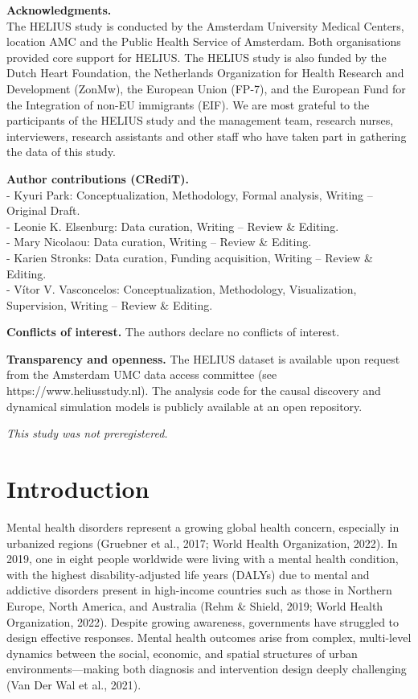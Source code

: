\documentclass[
]{article}
\begin{document}
\textbf{Acknowledgments.}\\
The HELIUS study is conducted by the Amsterdam University Medical
Centers, location AMC and the Public Health Service of Amsterdam. Both
organisations provided core support for HELIUS. The HELIUS study is also
funded by the Dutch Heart Foundation, the Netherlands Organization for
Health Research and Development (ZonMw), the European Union (FP-7), and
the European Fund for the Integration of non-EU immigrants (EIF). We are
most grateful to the participants of the HELIUS study and the management
team, research nurses, interviewers, research assistants and other staff
who have taken part in gathering the data of this study.

\textbf{Author contributions (CRediT).}\\
- Kyuri Park: Conceptualization, Methodology, Formal analysis, Writing
-- Original Draft.\\
- Leonie K. Elsenburg: Data curation, Writing -- Review \& Editing.\\
- Mary Nicolaou: Data curation, Writing -- Review \& Editing.\\
- Karien Stronks: Data curation, Funding acquisition, Writing -- Review
\& Editing.\\
- Vítor V. Vasconcelos: Conceptualization, Methodology, Visualization,
Supervision, Writing -- Review \& Editing.

\textbf{Conflicts of interest.} The authors declare no conflicts of
interest.

\textbf{Transparency and openness.} The HELIUS dataset is available upon
request from the Amsterdam UMC data access committee (see
https://www.heliusstudy.nl). The analysis code for the causal discovery
and dynamical simulation models is publicly available at an open
repository.

\emph{This study was not preregistered.}

\newpage

\section{Introduction}\label{introduction}

Mental health disorders represent a growing global health concern,
especially in urbanized regions (Gruebner et al., 2017; World Health
Organization, 2022). In 2019, one in eight people worldwide were living
with a mental health condition, with the highest disability-adjusted
life years (DALYs) due to mental and addictive disorders present in
high-income countries such as those in Northern Europe, North America,
and Australia (Rehm \& Shield, 2019; World Health Organization, 2022).
Despite growing awareness, governments have struggled to design
effective responses. Mental health outcomes arise from complex,
multi-level dynamics between the social, economic, and spatial
structures of urban environments---making both diagnosis and
intervention design deeply challenging (Van Der Wal et al., 2021).
\end{document}
